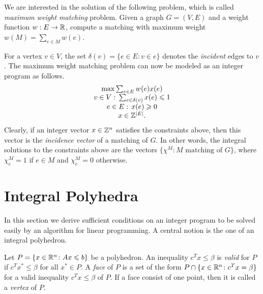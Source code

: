 We are interested in the solution of the following problem, which is
called \emph{maximum weight matching} problem. Given a graph $G =
(V,E)$ and a weight function $w:E\to\mathbb{R}$, compute a matching with
maximum weight $w(M) = \sum_{e \in M} w(e)$. 

For a vertex $v \in V$, the set $\delta(v) = \{e \in E \colon v \in e\}$ denotes
the \emph{incident} edges to $v$. 
The maximum weight matching problem  can now be modeled as an integer
program as follows. 
\begin{equation}
  \label{eq:45}
  \begin{array}{c}
    \max \sum_{e \in E} w(e) x(e) \\
    v \in V: \, \sum_{e \in \delta(v)} x(e)\leqslant1 \\
    e \in E:\,  x(e)  \geqslant0 \\
    x \in \mathbb{Z}^{|E|}.
  \end{array}
\end{equation}
% 
Clearly, if an integer vector $x \in \mathbb{Z}^n$ satisfies the constraints
above, then this vector is the \emph{incidence vector}  of a matching of
$G$. In other words, the integral solutions to the constraints above
are the vectors $\{\chi^M \colon M \text{ matching of }G\}$, where $\chi^M_e
= 1$ if $e \in M$ and $\chi^M_e=0$ otherwise. 

  
\section{Integral Polyhedra}


In this section we derive sufficient conditions on an integer program
to be solved easily by an algorithm for linear programming. A central
notion is the one of an integral polyhedron.  


\begin{definition} 
  \label{def:8}
  Let $P = \{ x \in \mathbb{R}^n \colon Ax\leqslant b\}$ be a polyhedron. An
  inequality $c^Tx\leq\beta$ is \emph{valid} for $P$ if $c^Tx^* \leq \beta$ for
  all $x^* \in P$.  A \emph{face} of $P$ is a set of the form $P \cap \{x
  \in \mathbb{R}^n \colon c^Tx = \beta\}$ for a valid inequality $c^Tx\leq\beta$ of $P$. If
  a face consist of one point, then it is called a \emph{vertex} of
  $P$. 
\end{definition}




